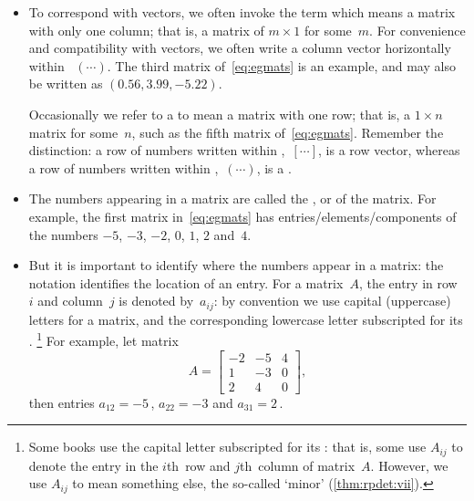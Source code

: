 \begin{itemize}
\item To correspond with vectors,  we often invoke the term  which means a matrix with only one column; that is, a matrix of  \(m\times 1\) for some~\(m\).
For convenience and compatibility with vectors, we often write a column vector horizontally within ~\((\cdots )\).
The third matrix of~\eqref{eq:egmats} is an example, and may also be written as \((0.56,3.99,-5.22)\).

Occasionally we refer to a  to mean a matrix with one row; that is, a \(1\times n\) matrix for some~\(n\), such as the fifth matrix of~\eqref{eq:egmats}.  
Remember the distinction: a row of numbers written within ,~\([\cdots]\), is a row vector, whereas a row of numbers written within ,~\((\cdots)\), is a .

\item The numbers appearing in a matrix are called the ,  or  of the matrix.  
For example, the first matrix in~\eqref{eq:egmats} has entries\slash elements\slash components of the numbers \(-5\), \(-3\), \(-2\), \(0\), \(1\), \(2\) and~\(4\).

\item But it is important to identify where the numbers appear in a matrix:  the  notation identifies the location of an entry.
For a matrix~\(A\), the entry in row~\(i\) and column~\(j\) is denoted by~\(a_{ij}\):
by convention we use capital (uppercase) letters for a matrix, and the corresponding lowercase letter subscripted for its .%
\footnote{Some books use the capital letter subscripted for its : that is, some use \(A_{ij}\) to denote the entry in the \(i\)th~row and \(j\)th~column of matrix~\(A\).  
However, we use \(A_{ij}\) to mean something else, the so-called `minor' (\autoref{thm:rpdet:vii}).}
For example, let matrix
\begin{equation*}
A=\begin{bmatrix}   -2 & -5 & 4
\\ 1 & -3 & 0
\\ 2 & 4 & 0 \end{bmatrix},
\end{equation*}
then entries \(a_{12}=-5\)\,, \(a_{22}=-3\) and \(a_{31}=2\)\,.

\end{itemize}
